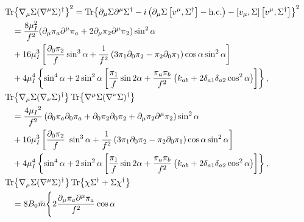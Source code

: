 \begin{align}
    \notag
    & \Tr{\nabla_\mu \Sigma (\nabla^\mu \Sigma)^\dagger}^2 
    =
    \Tr{\partial_\mu \Sigma \partial^\mu \Sigma ^\dagger
    - i \left( \partial_\mu \Sigma \com{v^\mu}{\Sigma^\dagger} - \hc \right)
    - \com{v_\mu}{\Sigma}\com{v^\mu}{\Sigma^\dagger} 
    }^2 \\\notag
    &\quad  =
    \frac{8 \mu_I^2}{f^2} 
    (\partial_\mu \pi_a \partial^\mu \pi_a + 2 \partial_\mu \pi_2 \partial^\mu \pi_2)
    \sin^2{\alpha} \\\notag
    &\quad  + 16 \mu_I^3 \left[
        \frac{\partial_0 \pi_2}{f}
            \sin^3{\alpha}
        + \frac{1}{f^2} \left(3 \pi_1 \partial_0 \pi_2 - \pi_2 \partial_0 \pi_1\right)
            \cos{\alpha} \sin^2{\alpha}
    \right] \\ \label{l1}
    & \quad + 4 \mu_I^4 
    \left\{
        \sin^4{\alpha}
        + 2 \sin^2{\alpha}
        \left[
            \frac{\pi_1}{f}\sin{2\alpha}
            + \frac{\pi_a \pi_b}{f^2}        
            \left(k_{ab} + 2\delta_{a1}\delta_{a2}\cos^2{\alpha} \right)
        \right]
    \right\}, \\
    \notag
    & \Tr{\nabla_\mu \Sigma (\nabla_\nu \Sigma)^\dagger} \Tr{\nabla^\mu \Sigma (\nabla^\nu \Sigma)^\dagger}\\ \notag
    & \quad = \frac{4 \mu_I{}^2}{f^2}
    \left(
        \partial_0 \pi_a\partial_0 \pi_a + \partial_0 \pi_2\partial_0 \pi_2 + \partial_\mu \pi_2\partial^\mu \pi_2
    \right) \sin^2{\alpha} \\\notag
    &\quad  + 16 \mu_I^3 \left[
        \frac{\partial_0 \pi_2}{f}\
            \sin^3{\alpha}
        + \frac{1}{f^2} \left(3 \pi_1 \partial_0 \pi_2 - \pi_2 \partial_0 \pi_1\right)
        \cos{\alpha} \sin^2{\alpha}
    \right] \\\label{l2}
    & \quad + 4 \mu_I^4 
    \left\{
        \sin^4{\alpha}
        + 2 \sin^2{\alpha}
        \left[
            \frac{\pi_1}{f}\sin{2\alpha} 
            + \frac{\pi_a \pi_b}{f^2}        
            \left(k_{ab} + 2 \delta_{a1}\delta_{a2} \cos^2{\alpha} \right)
        \right]
    \right\}, \\
    \notag
    & \Tr{\nabla_\mu \Sigma (\nabla^\mu \Sigma)^\dagger} 
    \Tr{\chi \Sigma^\dagger + \Sigma \chi^\dagger } \\\label{l4}
    & \quad =
    8 B_0 \bar m 
    \Bigg\{
        2 \frac{\partial_\mu \pi_a \partial^\mu \pi_a}{f^2} \cos{\alpha}

\end{align}
